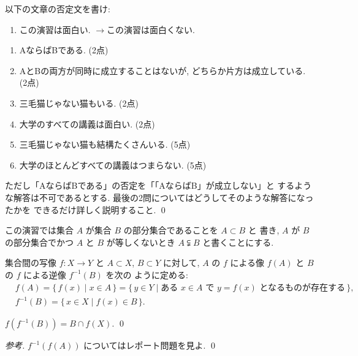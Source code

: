 \documentclass[12pt,twoside]{jarticle}
\begin{document}

\begin{question}
以下の文章の否定文を書け:
\begin{enumerate}
\renewcommand{\labelenumi}{(例)}
\item この演習は面白い. \quad$\longrightarrow$\quad この演習は面白くない. 
\end{enumerate}
\begin{enumerate}
\renewcommand{\labelenumi}{(\arabic{enumi})}
\item AならばBである. (2点)
\item AとBの両方が同時に成立することはないが, どちらか片方は成立している. (2点)
\item 三毛猫じゃない猫もいる. (2点)
\item 大学のすべての講義は面白い. (2点)
\item 三毛猫じゃない猫も結構たくさんいる. (5点)
\item 大学のほとんどすべての講義はつまらない. (5点) 
\end{enumerate}
ただし「AならばBである」の否定を「「AならばB」が成立しない」と
するような解答は不可であるとする.
最後の2問についてはどうしてそのような解答になったかを
できるだけ詳しく説明すること.
\qed
\end{question}


この演習では集合 $A$ が集合 $B$ の部分集合であることを $A\subset B$ と
書き, $A$ が $B$ の部分集合でかつ $A$ と $B$ が等しくないとき $A\subsetneqq B$ 
と書くことにする.

集合間の写像 $f:X\to Y$ と $A\subset X$, $B\subset Y$ に対して, %
$A$ の $f$ による像 $f(A)$ と $B$ の $f$ による逆像 $f^{-1}(B)$ を次の
ように定める:
\begin{align*}
  &
  f(A)
  = \{\, f(x) \mid x \in A\,\}
  = \{\, y\in Y\mid \text{ある $x\in A$ で $y=f(x)$ となるものが存在する}\,\},
  \\ &
  f^{-1}(B) = \{\, x\in X\mid f(x)\in B\,\}.
\end{align*}

\begin{question}[5点]
  $f(f^{-1}(B))=B\cap f(X)$. \qed
\end{question}

\begin{proof}[参考]
  $f^{-1}(f(A))$ についてはレポート問題を見よ. \qed
\end{proof}
\end{document}

